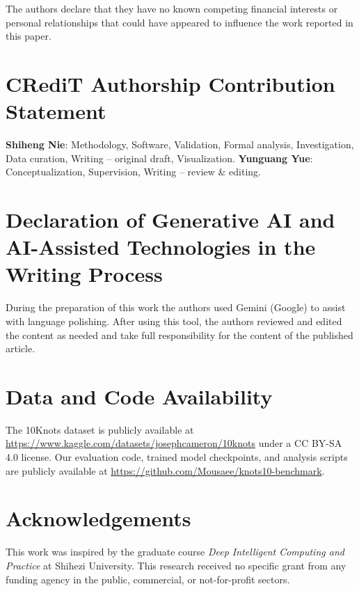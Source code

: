 \documentclass[preprint,review,12pt]{elsarticle}
\begin{document}
The authors declare that they have no known competing financial interests or personal relationships that could have appeared to influence the work reported in this paper.

\section*{CRediT Authorship Contribution Statement}

\textbf{Shiheng Nie}: Methodology, Software, Validation, Formal analysis, Investigation, Data curation, Writing -- original draft, Visualization. \textbf{Yunguang Yue}: Conceptualization, Supervision, Writing -- review \& editing.

\section*{Declaration of Generative AI and AI-Assisted Technologies in the Writing Process}

During the preparation of this work the authors used Gemini (Google) to assist with language polishing. After using this tool, the authors reviewed and edited the content as needed and take full responsibility for the content of the published article.

\section*{Data and Code Availability}

The 10Knots dataset is publicly available at \url{https://www.kaggle.com/datasets/josephcameron/10knots} under a CC BY-SA 4.0 license. Our evaluation code, trained model checkpoints, and analysis scripts are publicly available at \url{https://github.com/Mousaee/knots10-benchmark}.

\section*{Acknowledgements}

This work was inspired by the graduate course \emph{Deep Intelligent Computing and Practice} at Shihezi University. This research received no specific grant from any funding agency in the public, commercial, or not-for-profit sectors.




\clearpage
\appendix
\renewcommand{\thefigure}{S\arabic{figure}}
\renewcommand{\thetable}{S\arabic{table}}
\renewcommand{\theHfigure}{S\arabic{figure}}
\renewcommand{\theHtable}{S\arabic{table}}
\setcounter{figure}{0}
\setcounter{table}{0}
\end{document}
